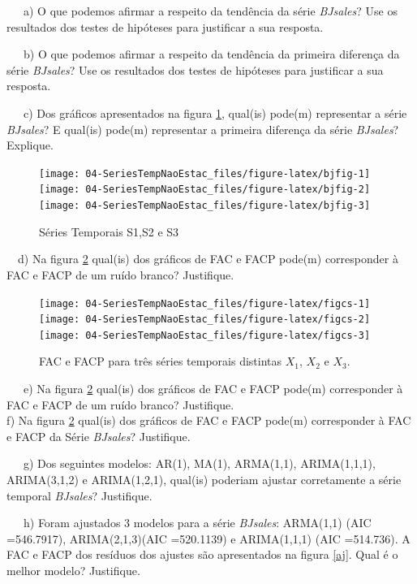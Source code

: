 \documentclass[
]{book}
\theoremstyle{definition}
\theoremstyle{definition}
\theoremstyle{definition}
\theoremstyle{remark}
\begin{document}
~~~a) O que podemos afirmar a respeito da tendência da série \emph{BJsales}? Use os resultados dos testes de hipóteses para justificar a sua resposta.

~~~b) O que podemos afirmar a respeito da tendência da primeira diferença da série \emph{BJsales}? Use os resultados dos testes de hipóteses para justificar a sua resposta.

~~~c) Dos gráficos apresentados na figura \ref{fig:bjfig}, qual(is) pode(m) representar a série \emph{BJsales}? E qual(is) pode(m) representar a primeira diferença da série \emph{BJsales}? Explique.

\begin{figure}
\texttt{[image: 04-SeriesTempNaoEstac\_files/figure-latex/bjfig-1]} \texttt{[image: 04-SeriesTempNaoEstac\_files/figure-latex/bjfig-2]} \texttt{[image: 04-SeriesTempNaoEstac\_files/figure-latex/bjfig-3]} \caption{Séries Temporais S1,S2 e S3}\label{fig:bjfig}
\end{figure}

~~d) Na figura \ref{fig:figcs} qual(is) dos gráficos de FAC e FACP pode(m) corresponder à FAC e FACP de um ruído branco? Justifique.

\begin{figure}
\texttt{[image: 04-SeriesTempNaoEstac\_files/figure-latex/figcs-1]} \texttt{[image: 04-SeriesTempNaoEstac\_files/figure-latex/figcs-2]} \texttt{[image: 04-SeriesTempNaoEstac\_files/figure-latex/figcs-3]} \caption{FAC e FACP para três séries temporais distintas $X_1$, $X_2$ e $X_3$.}\label{fig:figcs}
\end{figure}

~~~e) Na figura \ref{fig:figcs} qual(is) dos gráficos de FAC e FACP pode(m) corresponder à FAC e FACP de um ruído branco? Justifique.\\
\hspace*{0.333em}\hspace*{0.333em}\hspace*{0.333em}f) Na figura \ref{fig:figcs} qual(is) dos gráficos de FAC e FACP pode(m) corresponder à FAC e FACP da Série \emph{BJsales}? Justifique.

~~~g) Dos seguintes modelos: AR(1), MA(1), ARMA(1,1), ARIMA(1,1,1), ARIMA(3,1,2) e ARIMA(1,2,1), qual(is) poderiam ajustar corretamente a série temporal \emph{BJsales}? Justifique.

~~~h) Foram ajustados 3 modelos para a série \emph{BJsales}: ARMA(1,1) (AIC =546.7917), ARIMA(2,1,3)(AIC =520.1139) e ARIMA(1,1,1) (AIC =514.736). A FAC e FACP dos resíduos dos ajustes são apresentados na figura \ref{aj}. Qual é o melhor modelo? Justifique.
\end{document}
